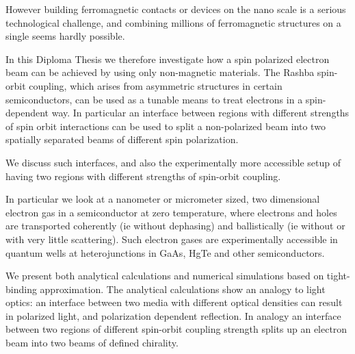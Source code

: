 However building ferromagnetic contacts or devices on
the nano scale is a serious technological challenge, and combining millions of
ferromagnetic structures on a single seems hardly possible.

In this Diploma Thesis we therefore investigate how a spin polarized electron
beam can be achieved by using only non-magnetic materials. The Rashba 
spin-orbit coupling, which arises from
asymmetric structures in certain semiconductors, can be used as a tunable
means to treat
electrons in a spin-dependent way. In particular an interface
between regions with different strengths of spin orbit interactions can be
used to split a non-polarized beam into two spatially separated beams of
different spin polarization.

We discuss such interfaces, and also the experimentally more accessible setup
of having two regions with different strengths of spin-orbit coupling.

In particular we look at a nanometer or micrometer sized, two dimensional
electron gas in a semiconductor at zero temperature, where electrons and holes
are transported coherently (ie without dephasing) and ballistically (ie
without or with very little scattering). Such electron gases are
experimentally accessible in quantum wells at heterojunctions in GaAs,
HgTe and other semiconductors.

We present both analytical calculations and numerical simulations based on
tight-binding approximation. The analytical calculations show an analogy to
light optics:  an interface between two media with different optical densities
can result in polarized light, and polarization dependent reflection. In
analogy an interface between two regions of different spin-orbit coupling
strength splits up an electron beam into two beams of defined chirality.

